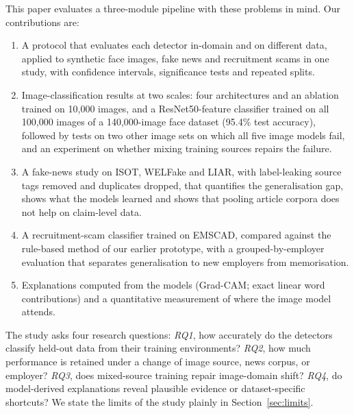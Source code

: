 \documentclass[11pt,a4paper]{article}
\begin{document}
This paper evaluates a three-module pipeline with these problems in mind. Our contributions are:
\begin{enumerate}
\item A protocol that evaluates each detector in-domain and on different data, applied to synthetic face images, fake news and recruitment scams in one study, with confidence intervals, significance tests and repeated splits.
\item Image-classification results at two scales: four architectures and an ablation trained on 10{,}000 images, and a ResNet50-feature classifier trained on all 100{,}000 images of a 140{,}000-image face dataset (95.4\% test accuracy), followed by tests on two other image sets on which all five image models fail, and an experiment on whether mixing training sources repairs the failure.
\item A fake-news study on ISOT, WELFake and LIAR, with label-leaking source tags removed and duplicates dropped, that quantifies the generalisation gap, shows what the models learned and shows that pooling article corpora does not help on claim-level data.
\item A recruitment-scam classifier trained on EMSCAD, compared against the rule-based method of our earlier prototype, with a grouped-by-employer evaluation that separates generalisation to new employers from memorisation.
\item Explanations computed from the models (Grad-CAM; exact linear word contributions) and a quantitative measurement of where the image model attends.
\end{enumerate}
The study asks four research questions: \emph{RQ1}, how accurately do the detectors classify
held-out data from their training environments? \emph{RQ2}, how much performance is retained
under a change of image source, news corpus, or employer? \emph{RQ3}, does mixed-source training
repair image-domain shift? \emph{RQ4}, do model-derived explanations reveal plausible evidence or
dataset-specific shortcuts? We state the limits of the study plainly in Section~\ref{sec:limits}.
\end{document}
